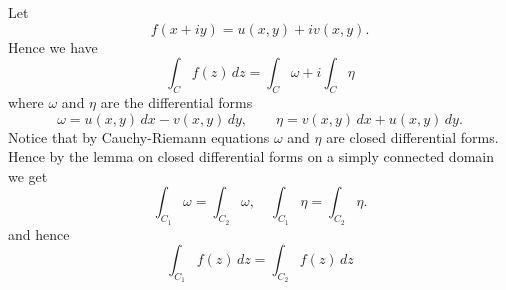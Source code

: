 \documentclass[12pt]{article}
\begin{document}
Let
\[
  f(x+iy) = u(x,y) + i v(x,y).
\]
Hence we have
\[
  \int_C f(z)\, dz = \int_C \omega + i \int_C \eta 
\]
where $\omega$ and $\eta$ are the differential forms
\[
  \omega = u(x,y)\,dx - v(x,y)\, dy,\qquad
   \eta = v(x,y)\, dx + u(x,y)\, dy.
\]
Notice that by Cauchy-Riemann equations $\omega$ and $\eta$ are closed differential forms. Hence by the lemma on closed differential forms on a simply connected domain we get 
\[
  \int_{C_1} \omega = \int_{C_2} \omega,\quad
  \int_{C_1} \eta = \int_{C_2} \eta.
\]
and hence
\[
  \int_{C_1} f(z)\, dz = \int_{C_2} f(z)\, dz
\]
\end{document}
